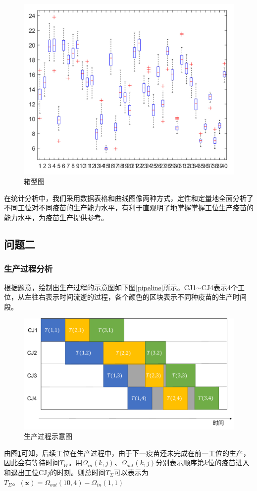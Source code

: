 \documentclass[UTF8]{ctexart}
\begin{document}
	\begin{figure}[H]
		\centering %
		\includegraphics[scale=0.5]{2_xiangxing.jpg}
		\caption{箱型图}
	\end{figure}
	在统计分析中，我们采用数据表格和曲线图像两种方式，定性和定量地全面分析了不同工位对不同疫苗的生产能力水平，有利于直观明了地掌握掌握工位生产疫苗的能力水平，为疫苗生产提供参考。
	
	\subsection{问题二}
	\subsubsection{生产过程分析}
	根据题意，绘制出生产过程的示意图如下图\ref{pipeline}所示。CJ1$\sim$CJ4表示4个工位，从左往右表示时间流逝的过程，各个颜色的区块表示不同种疫苗的生产时间段。
	\begin{figure}[H]
		\centering %
		\includegraphics[scale=0.5]{pipe1.pdf}
		\caption{生产过程示意图}\label{pipeline1}
	\end{figure}
	由图\ref{pipeline1}可知，后续工位在生产过程中，由于下一疫苗还未完成在前一工位的生产，因此会有等待时间$T_{W}$。用$\Omega_{in}(k,j)$、$\Omega_{out}(k,j)$分别表示顺序第$k$位的疫苗进入和退出工位CJ$j$的时刻。则总时间$T_{\Sigma}$可以表示为$T_{\Sigma}。(\boldsymbol{x})=\Omega_{out}(10,4)-\Omega_{in}(1,1)$
\end{document}
